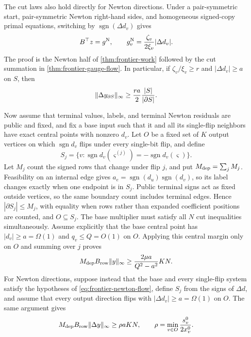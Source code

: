 The cut laws also hold directly for Newton directions.  Under a
pair-symmetric start, pair-symmetric Newton right-hand sides, and homogeneous
signed-copy primal equations, switching by
\(\operatorname{sgn}(\Delta d_v)\) gives
\begin{equation}
 B^\top z=g^{\rm N},
 \qquad g_v^{\rm N}=\frac{\zeta_v}{2\xi_v}|\Delta d_v|.
 \label{eq:frontier-newton-flow}
\end{equation}
The proof is the Newton half of \cref{thm:frontier-work} followed by
the cut summation in \cref{thm:frontier-gauge-flow}.  In particular,
if \(\zeta_v/\xi_v\geq r\) and \(|\Delta d_v|\geq a\) on \(S\), then
\[
 \lVert\Delta y_{\partial S}\rVert_\infty
 \geq\frac{ra}{2}\frac{|S|}{|\partial S|}.
\]

Now assume that terminal values, labels, and terminal Newton residuals are
public and fixed, and fix a base input such that it and all its
single-flip neighbors have exact central points with nonzero \(d_v\).  Let
\(O\) be a fixed set of \(K\) output vertices on which
\(\operatorname{sgn}d_v\) flips under every single-bit flip, and define
\[
 S_j=\{v:\operatorname{sgn}d_v(\varsigma^{(j)})
             =-\operatorname{sgn}d_v(\varsigma)\}.
\]
Let \(M_j\) count the signed rows that change under flip \(j\), and put
\(M_{\rm dep}=\sum_jM_j\).  Feasibility on an internal edge gives
\(a_e=\operatorname{sgn}(d_u)\operatorname{sgn}(d_v)\), so its label changes
exactly when one endpoint is in \(S_j\).  Public terminal signs act as fixed
outside vertices, so the same boundary count includes terminal edges.
Hence
\(|\partial S_j|\leq M_j\), with equality when rows rather than expanded
coefficient positions are counted, and \(O\subseteq S_j\).  The base
multiplier must satisfy all \(N\) cut inequalities simultaneously.  Assume
explicitly that the base central point has
\(|d_v|\geq a=\Omega(1)\) and \(q_v\leq Q=O(1)\) on \(O\).  Applying this
central margin only on \(O\) and summing over \(j\) proves
\begin{equation}
 M_{\rm dep}B_{\rm row}\lVert y\rVert_\infty
 \geq\frac{2\mu a}{Q^2-a^2}KN.
 \label{eq:frontier-central-incidence}
\end{equation}
For Newton directions, suppose instead that the base and every single-flip
system satisfy the hypotheses of \eqref{eq:frontier-newton-flow}, define
\(S_j\) from the signs of \(\Delta d\), and assume that every output
direction flips with \(|\Delta d_v|\geq a=\Omega(1)\) on \(O\).  The same
argument gives
\begin{equation}
 M_{\rm dep}B_{\rm row}\lVert\Delta y\rVert_\infty
 \geq\rho aKN,
 \qquad \rho=\min_{v\in O}\frac{s_v^0}{2x_v^0}.
 \label{eq:frontier-newton-incidence}
\end{equation}

